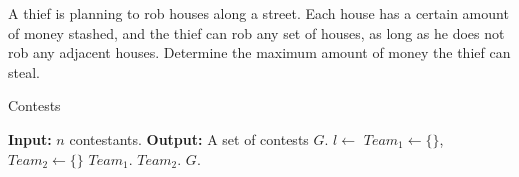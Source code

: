 \problem{}
A thief is planning to rob houses along a street. Each house has a certain amount of money stashed, and the thief can rob any set of houses, as long as he does not rob any adjacent houses.  Determine the maximum amount of money the thief can steal.

\solution{}



\begin{algorithm}
    \caption{Contests}\label{alg:problem-3}
    \begin{algorithmic}[1]
    \State \textbf{Input:} $n$ contestants.
    \State \textbf{Output:} A set of contests $G$.
    \State $l \gets$ 
        \State $Team_1 \gets \{\}$, $Team_2 \gets \{\}$
                \State $Team_1$.
            \Else
                \State $Team_2$.
            \EndIf
        \EndFor
        \State $G$.
    \EndFor
    \end{algorithmic}
\end{algorithm}





\newpage